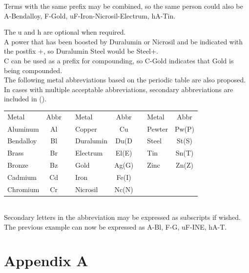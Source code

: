 \documentclass[conference]{IEEEtran}
\newcommand{\n}{\hfill\break}
\begin{document}
Terms with the same prefix may be combined, so the same person could also be A-Bendalloy, F-Gold, uF-Iron-Nicrosil-Electrum, hA-Tin.  

	
	


The u and h are optional when required.\\

A power that has been boosted by Duralumin or Nicrosil and be indicated with the postfix +, so Duralumin Steel would be Steel+. \\

C can be used as a prefix for compounding, so C-Gold indicates that Gold is being compounded.\\

The following metal abbreviations based on the periodic table are also proposed.  In cases with multiple acceptable abbreviations, secondary abbreviations are included in ().\\\n
\setlength{\tabcolsep}{.5\tabcolsep}
\begin{tabular}{|l |c |c|l |c |c|l |c | }
	
	\cline{1-2}\cline{4-5}\cline{7-8}
	Metal&Abbr&&Metal&Abbr&&Metal&Abbr\\
	\cline{1-2}\cline{4-5}\cline{7-8}
	
	\cline{1-2}\cline{4-5}\cline{7-8}
	Aluminum & Al&&  Copper & Cu && 	Pewter & Pw(P) \\ 
	\cline{1-2}\cline{4-5}\cline{7-8}
	Bendalloy & Bl && Duralumin &Du(D &&  	Steel & St(S)\\
	\cline{1-2}\cline{4-5}\cline{7-8}
	Brass & Br && Electrum& El(E) &&  Tin & Sn(T)\\
	\cline{1-2}\cline{4-5}\cline{7-8}
	Bronze & Bz &&	Gold&Ag(G)  &&Zinc & Zn(Z)  \\
	\cline{1-2}\cline{4-5}\cline{7-8}
Cadmium & Cd&&	Iron & Fe(I)  \\
	\cline{1-2}\cline{4-5}
	Chromium &Cr&& Nicrosil & Nc(N) \\
	\cline{1-2}\cline{4-5}
\end{tabular}\\

Secondary letters in the abbreviation may be expressed as subscripts if wished.
The previous example can now be expressed as A-Bl, F-G, uF-INE, hA-T.  

\newpage{}
{}


\clearpage
\onecolumn
\section*{Appendix A}
\end{document}
